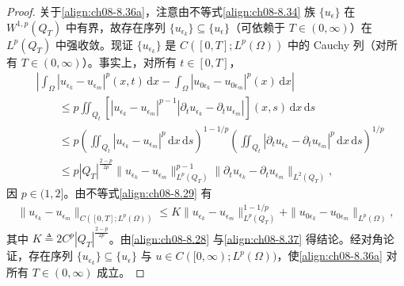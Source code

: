 \documentclass[../../main.tex]{subfiles}%
\begin{document}
\begin{proof}
关于\eqref{align:ch08-8.36a}，注意由不等式\eqref{align:ch08-8.34} 族 $\{u_\epsilon\}$ 在 $W^{1,p}(Q_T)$ 中有界，故存在序列 $\{u_{\epsilon_k}\}\subseteq\{u_\epsilon\}$（可依赖于 $T\in(0,\infty)$）在 $L^p(Q_T)$ 中强收敛。现证 $\{u_{\epsilon_k}\}$ 是 $C([0,T];L^p(\Omega))$ 中的 Cauchy 列（对所有 $T\in(0,\infty)$）。事实上，对所有 $t\in[0,T]$，
\begin{align*}
&\left|\int_\Omega|u_{\epsilon_k}-u_{\epsilon_m}|^p(x,t)\,\mathrm{d}x-\int_\Omega|u_{0\epsilon_k}-u_{0\epsilon_m}|^p(x)\,\mathrm{d}x\right|\\
&\qquad\leqslant p\iint_{Q_t}[|u_{\epsilon_k}-u_{\epsilon_m}|^{p-1}|\partial_t u_{\epsilon_k}-\partial_t u_{\epsilon_m}|](x,s)\,\mathrm{d}x\,\mathrm{d}s\\
&\qquad\leqslant p\left(\iint_{Q_t}|u_{\epsilon_k}-u_{\epsilon_m}|^p\,\mathrm{d}x\,\mathrm{d}s\right)^{1-1/p}
\left(\iint_{Q_t}|\partial_t u_{\epsilon_k}-\partial_t u_{\epsilon_m}|^p\,\mathrm{d}x\,\mathrm{d}s\right)^{1/p}\\
&\qquad\leqslant p|Q_T|^{\frac{2-p}{2p}}
\|u_{\epsilon_k}-u_{\epsilon_m}\|^{p-1}_{L^p(Q_T)}
\|\partial_t u_{\epsilon_k}-\partial_t u_{\epsilon_m}\|_{L^2(Q_T)},
\end{align*}
因 $p\in(1,2]$。由不等式\eqref{align:ch08-8.29} 有
\begin{align}
\|u_{\epsilon_k}-u_{\epsilon_m}\|_{C([0,T];L^p(\Omega))}
\leqslant K\|u_{\epsilon_k}-u_{\epsilon_m}\|^{1-1/p}_{L^p(Q_T)}
+\|u_{0\epsilon_k}-u_{0\epsilon_m}\|_{L^p(\Omega)}, \label{align:ch08-8.37}
\end{align}
其中 $K\triangleq 2C^p|Q_T|^{\frac{2-p}{2p}}$。由\eqref{align:ch08-8.28} 与\eqref{align:ch08-8.37} 得结论。经对角论证，存在序列 $\{u_{\epsilon_k}\}\subseteq\{u_\epsilon\}$ 与 $u\in C([0,\infty);L^p(\Omega))$，使\eqref{align:ch08-8.36a} 对所有 $T\in(0,\infty)$ 成立。


\end{proof}
\end{document}
